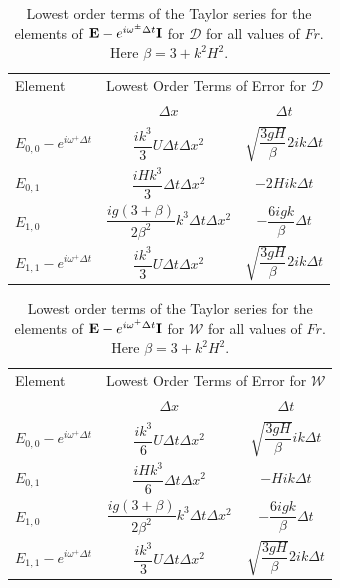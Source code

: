\begin{table}
	\begin{tabular}{l  c c}
	\hline
		Element & \multicolumn{2}{c}{Lowest Order Terms of Error for $\mathcal{D}$} \T \B \\
		\cline{2-3}
		& $\Delta x$&$\Delta t$ \T \B \\
		\hline
		$E_{0,0} -  e^{i \omega^+ \Delta t} $&  $\dfrac{ik^3}{3} U \Delta t \Delta x^2$ & $ \sqrt{\dfrac{3gH}{\beta}} 2ik \Delta t $ \T \B  \\
		$E_{0,1}$& $\dfrac{iHk^3}{3} \Delta t \Delta x^2$ &  $-2Hi k \Delta t$ \T \B  \\
		$E_{1,0}$& $ \dfrac{ig \left(3 + \beta\right)}{2\beta^2} k^3\Delta t \Delta x^2$ &  $ -\dfrac{6igk}{\beta} \Delta t$ \T \B  \\
		$E_{1,1} -  e^{i \omega^+ \Delta t}$& $\dfrac{ik^3}{3} U \Delta t \Delta x^2$ & $ \sqrt{\dfrac{3gH}{\beta}} 2ik \Delta t $ \T \B  \\  \hline
	\end{tabular}
	\caption{Lowest order terms of the Taylor series for the elements of $\mathbf{E} - e^{i \omega^\pm \Delta t} \mathbf{I}$ for $\mathcal{D}$ for all values of $Fr$. Here $\beta = 3 + k^2 H^2$.}
	\label{tab:EerrD} 
\end{table}
\begin{table}
	\begin{tabular}{l  c c}
	\hline
		Element & \multicolumn{2}{c}{Lowest Order Terms of Error for $\mathcal{W}$} \T \B \\
		\cline{2-3} 
		& $\Delta x$&$\Delta t$ \T \B \\
		\hline 
		$E_{0,0} -  e^{i \omega^+ \Delta t} $&  $\dfrac{ik^3}{6} U \Delta t \Delta x^2$ & $ \sqrt{\dfrac{3gH}{\beta}} ik \Delta t $ \T \B \\
		$E_{0,1}$& $\dfrac{iHk^3}{6} \Delta t \Delta x^2$ &  $-Hi k \Delta t$ \T \B \\
		$E_{1,0}$& $ \dfrac{ig \left(3 + \beta\right)}{2\beta^2} k^3\Delta t \Delta x^2$ &  $ -\dfrac{6igk}{\beta} \Delta t$ \T \B  \\
		$E_{1,1} -  e^{i \omega^+ \Delta t}$& $\dfrac{ik^3}{3} U \Delta t \Delta x^2$ & $ \sqrt{\dfrac{3gH}{\beta}} 2ik \Delta t $ \T \B  \\  \hline
	\end{tabular}
	\caption{Lowest order terms of the Taylor series for the elements of $\mathbf{E} - e^{i \omega^+ \Delta t} \mathbf{I}$ for $\mathcal{W}$ for all values of $Fr$. Here $\beta = 3 + k^2 H^2$.}
	\label{tab:EerrW} 
\end{table}

